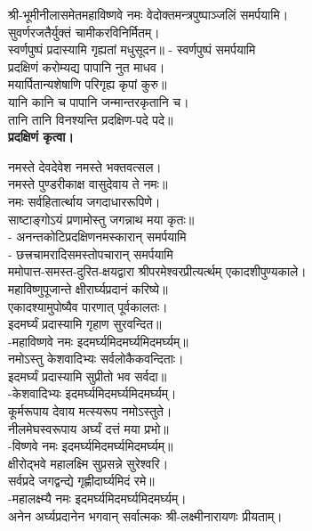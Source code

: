 श्री-भूमीनीलासमेतमहाविष्णवे नमः वेदोक्तमन्त्रपुष्पाञ्जलिं समर्पयामि।\\

सुवर्णरजतैर्युक्तं चामीकरविनिर्मितम्।\\
स्वर्णपुष्पं प्रदास्यामि गृह्यतां मधुसूदन॥ - स्वर्णपुष्पं समर्पयामि\\
 
प्रदक्षिणं करोम्यद्य पापानि नुत माधव।\\
मयार्पितान्यशेषाणि परिगृह्य कृपां कुरु॥\\
 यानि कानि च पापानि जन्मान्तरकृतानि च।\\
तानि तानि विनश्यन्ति प्रदक्षिण-पदे पदे॥\\
\textbf{प्रदक्षिणं कृत्वा।}
\medskip

नमस्ते देवदेवेश नमस्ते भक्तवत्सल।\\
नमस्ते पुण्डरीकाक्ष वासुदेवाय ते नमः॥\\
नमः सर्वहितार्त्थाय जगदाधाररूपिणे।\\
साष्टाङ्गोऽयं प्रणामोस्तु जगन्नाथ मया कृतः॥\\
- अनन्तकोटिप्रदक्षिणनमस्कारान् समर्पयामि\\
 - छत्त्रचामरादिसमस्तोपचारान् समर्पयामि\\

ममोपात्त-समस्त-दुरित-क्षयद्वारा श्रीपरमेश्वरप्रीत्यर्त्थम् एकादशीपुण्यकाले।\\
 महाविष्णुपूजान्ते क्षीरार्घ्यप्रदानं करिष्ये॥\\

एकादश्यामुपोष्यैव पारणात् पूर्वकालतः।\\
इदमर्घ्यं प्रदास्यामि गृहाण सुरवन्दित॥\\
	-महाविष्णवे नमः इदमर्घ्यमिदमर्घ्यमिदमर्घ्यम्॥\\
नमोऽस्तु केशवादिभ्यः सर्वलोकैकवन्दिताः।\\
इदमर्घ्यं प्रदास्यामि सुप्रीतो भव सर्वदा॥\\
	-केशवादिभ्यः इदमर्घ्यमिदमर्घ्यमिदमर्घ्यम्।\\
कूर्मरूपाय देवाय मत्स्यरूप नमोऽस्तुते। \\
नीलमेघस्वरूपाय अर्घ्यं दत्तं मया प्रभो॥\\
	-विष्णवे नमः इदमर्घ्यमिदमर्घ्यमिदमर्घ्यम्॥\\
 क्षीरोद्भवे महालक्ष्मि सुप्रसन्ने सुरेश्वरि।\\
सर्वप्रदे जगद्वन्द्ये गृह्णीदार्घ्यमिदं रमे॥ \\
	-महालक्ष्म्यै नमः इदमर्घ्यमिदमर्घ्यमिदमर्घ्यम्।\\
अनेन अर्घ्यप्रदानेन भगवान् सर्वात्मकः श्री-लक्ष्मीनारायणः प्रीयताम्।\\

